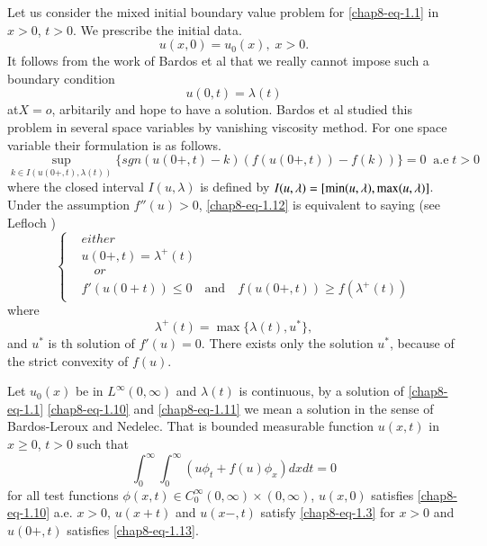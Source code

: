 Let us consider the mixed initial boundary value problem for \eqref{chap8-eq-1.1} in $x >0$, $t > 0$. We prescribe the initial data.
\begin{equation}\label{chap8-eq-1.10}
u(x, 0) = u_{0}(x), \; x > 0.
\end{equation}
It follows from the work of Bardos et al \cite{chap8-key1} that we really cannot impose such a boundary condition
\begin{equation}\label{chap8-eq-1.11}
u(0,t)= \lambda(t)
\end{equation}
at\pageoriginale $X=o$, arbitarily and hope to have a solution. Bardos et al studied this problem in several space variables by vanishing viscosity method. For one space variable their formulation is as follows.
\begin{equation}\label{chap8-eq-1.12}
\sup\limits_{k\in I(u(0+,t), \lambda(t))}\{sgn (u(0+,t)-k)(f(u(0+,t))-f(k))\} =0 \;\; \text{a.e} \;t > 0
\end{equation}
where the closed interval $I(u, \lambda)$ is defined by $I(u, \lambda) = [\min(u, \lambda),\break \max(u, \lambda)]$. Under the assumption $f''(u)> 0$, \eqref{chap8-eq-1.12} is equivalent to saying (see Lefloch \cite{chap8-key10})
\begin{equation}\label{chap8-eq-1.13}
\left\{
\begin{aligned}
& either\\
 & u(0+, t)= \lambda^{+}(t)\\
& \quad {or}\\
 & f'(u(0+t))\leq 0 \quad \text{and}\quad f(u(0+,t))\geq f(\lambda^{+}(t))
\end{aligned}
\right.
\end{equation}
where
\begin{equation}\label{chap8-eq-1.14}
\lambda^{+}(t) = \max\{\lambda(t), u^{*}\},
\end{equation}
and $u^{*}$ is th solution of $f'(u) =0$. There exists only the solution $u^{*}$, because of the strict convexity of $f(u)$.

\begin{defi*}
Let $u_{0}(x)$ be in $L^{\infty}(0, \infty)$ and $\lambda(t)$ is continuous, by a solution of \eqref{chap8-eq-1.1}
\eqref{chap8-eq-1.10} and \eqref{chap8-eq-1.11} we mean a solution in the sense of Bardos-Leroux and Nedelec. That is bounded measurable function $u(x,t)$ in $x\geq 0$, $t>0$ such that
\begin{equation}\label{chap8-eq-1.15}
\int_{0}^{\infty} \int_{0}^{\infty}(u\phi_{t} + f(u)\phi_{x})dxdt =0
\end{equation}
 for all test functions $\phi(x,t) \in C_{0}^{\infty}(0,\infty) \times (0,\infty)$, $u(x, 0)$ satisfies
\eqref{chap8-eq-1.10} a.e. $x>0$, $u(x+t)$ and $u(x-,t)$ satisfy \eqref{chap8-eq-1.3} for $x>0$ and $u(0+, t)$ satisfies  \eqref{chap8-eq-1.13}.
\end{defi*}

